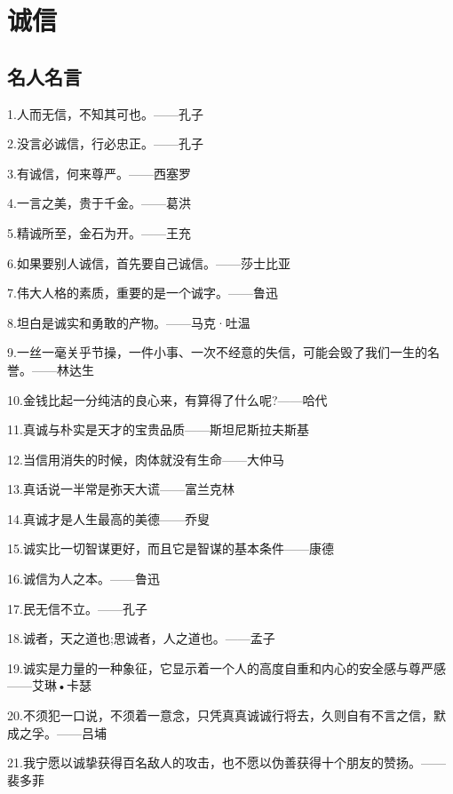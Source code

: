 \documentclass[UTF8]{ctexart}
\begin{document}
\section{诚信}
\subsection{名人名言}
1.人而无信，不知其可也。——孔子\par
2.没言必诚信，行必忠正。——孔子\par
3.有诚信，何来尊严。——西塞罗\par
4.一言之美，贵于千金。——葛洪\par
5.精诚所至，金石为开。——王充\par
6.如果要别人诚信，首先要自己诚信。——莎士比亚\par
7.伟大人格的素质，重要的是一个诚字。——鲁迅\par
8.坦白是诚实和勇敢的产物。——马克·吐温\par
9.一丝一毫关乎节操，一件小事、一次不经意的失信，可能会毁了我们一生的名誉。——林达生\par
10.金钱比起一分纯洁的良心来，有算得了什么呢?——哈代\par
11.真诚与朴实是天才的宝贵品质——斯坦尼斯拉夫斯基\par
12.当信用消失的时候，肉体就没有生命——大仲马\par
13.真话说一半常是弥天大谎——富兰克林\par
14.真诚才是人生最高的美德——乔叟\par
15.诚实比一切智谋更好，而且它是智谋的基本条件——康德\par
16.诚信为人之本。——鲁迅\par
17.民无信不立。——孔子\par
18.诚者，天之道也;思诚者，人之道也。——孟子\par
19.诚实是力量的一种象征，它显示着一个人的高度自重和内心的安全感与尊严感——艾琳•卡瑟\par
20.不须犯一口说，不须着一意念，只凭真真诚诚行将去，久则自有不言之信，默成之孚。——吕埔\par
21.我宁愿以诚挚获得百名敌人的攻击，也不愿以伪善获得十个朋友的赞扬。——裴多菲\par
\end{document}
